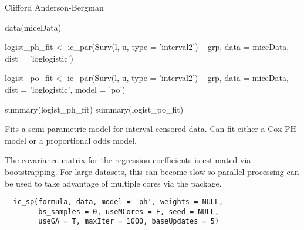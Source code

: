\documentclass[a4paper]{book}
\begin{document}
%
\begin{Author}\relax
Clifford Anderson-Bergman
\end{Author}
%
\begin{Examples}
\begin{ExampleCode}
	data(miceData)
	
	logist_ph_fit <- ic_par(Surv(l, u, type = 'interval2') ~ grp, 
	                        data = miceData, dist = 'loglogistic')

	logist_po_fit <- ic_par(Surv(l, u, type = 'interval2') ~ grp, 
	                        data = miceData, dist = 'loglogistic', model = 'po')

	summary(logist_ph_fit)
	summary(logist_po_fit)
\end{ExampleCode}
\end{Examples}
%
\begin{Description}\relax
Fits a semi-parametric model for interval censored data. Can fit either a Cox-PH model or a proportional odds model.  

The covariance matrix for the regression coefficients is estimated via bootstrapping. For large datasets, this can become slow so parallel processing can be used to take advantage of multiple cores via the  package. 


\end{Description}
%
\begin{Usage}
\begin{verbatim}
  ic_sp(formula, data, model = 'ph', weights = NULL,
        bs_samples = 0, useMCores = F, seed = NULL,
        useGA = T, maxIter = 1000, baseUpdates = 5) 
\end{verbatim}
\end{Usage}
%
\end{document}
